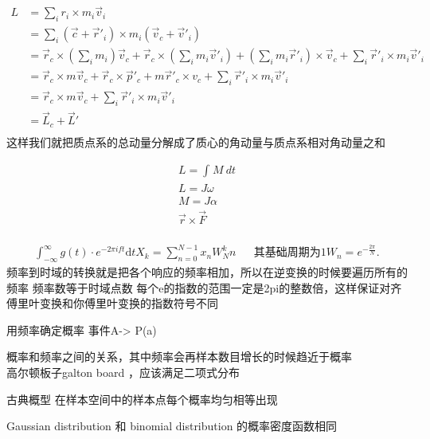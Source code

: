 \begin{thm}[质点系角动量的分解]
\begin{align*}
		L &= \sum_{i}^{} r_i \times m_i\vec v_i\\
		&= \sum_{i}^{}(\vec c+ \vec r'_i)\times m_i(\vec v_c+\vec v'_i) \\
		&= \vec r_c\times (\sum_i m_i)\vec v_c+ \vec r_c\times (\sum_im_i\vec v'_i)+(\sum_im_i\vec r'_i)\times \vec v_c+\sum_i\vec r'_i\times m_i\vec v'_i\\
		&= \vec r_c\times m\vec v_c+\vec r_c\times \vec p'_c+m\vec r'_c\times v_c+\sum_i\vec r'_i\times m_i\vec v'_i \\
		&= \vec r_c\times m\vec v_c + \sum_i\vec r'_i\times m_i\vec v'_i \\
		&= \vec L_c + \vec L' \\
\end{align*}
这样我们就把质点系的总动量分解成了质心的角动量与质点系相对角动量之和
\end{thm}
\begin{thm}
\begin{align*}
		L = \int_{{}}^{{}} {M} \: d{t} {}\\
		L = J\omega \\
		M = J \alpha \\
		\vec r\times \vec F\\
\end{align*}
\end{thm}
\begin{thm}[快速傅里叶变换]
	\begin{align*}
			\int_{-\infty}^{\infty}  g(t)\cdot  e^{-2\pi i ft } \mathrm{d}t  
			X_k = \sum_{n=0}^{N-1} x_nW_N^kn  && \text{其基础周期为1}W_n = e^{-\frac{2\pi}{N} }
	.\end{align*}
	频率到时域的转换就是把各个响应的频率相加，所以在逆变换的时候要遍历所有的频率
	频率数等于时域点数
	每个e的指数的范围一定是2pi的整数倍，这样保证对齐
	傅里叶变换和你傅里叶变换的指数符号不同 
\end{thm}
\begin{thm}
		用频率确定概率
		事件A-> P(a)

概率和频率之间的关系，其中频率会再样本数目增长的时候趋近于概率\\
	高尔顿板子galton board ，应该满足二项式分布

	古典概型
	在样本空间中的样本点每个概率均匀相等出现

\end{thm}
\begin{thm}
		[高斯分布与二项分布]
		Gaussian distribution 和 binomial distribution 的概率密度函数相同
\end{thm}
